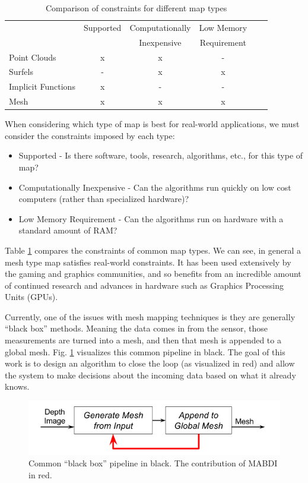 \begin{table}[h]
  \caption{Comparison of constraints for different map types}
  \label{tab:rep}
  \begin{footnotesize}
  \begin{center}
    \begin{tabular}{|l|c|c|c|c|c|}
    \hline
    \multirow{2}{*}{} & Supported & Computationally & Low Memory \\
     & & Inexpensive & Requirement \\\hline
    Point Clouds		& x & x & - \\
    Surfels             	& - & x & x \\
    Implicit Functions 	& x & - & - \\
    Mesh	 	& x & x & x \\
    \hline
    \end{tabular}
  \end{center}
  \end{footnotesize}
\end{table}

When considering which type of map is best for real-world applications, we must
consider the constraints imposed by each type:

\begin{itemize}
  \item Supported - Is there software, tools, research, algorithms, etc., for
  this type of map?
  \item Computationally Inexpensive - Can the algorithms run quickly on low cost
  computers (rather than specialized hardware)?
  \item Low Memory Requirement - Can the algorithms run on hardware with
  a standard amount of RAM?
\end{itemize}

Table \ref{tab:rep} compares the constraints of common map types. We can see, in
general a mesh type map satisfies real-world constraints. It has been used
extensively by the gaming and graphics communities, and so benefits from an
incredible amount of continued research and advances in hardware such as
Graphics Processing Units (GPUs).

Currently, one of the issues with mesh mapping techniques is they are generally
``black box'' methods. Meaning the data comes in from the sensor, those
measurements are turned into a mesh, and then that mesh is appended to a global
mesh. Fig. \ref{fig:pipeline} visualizes this common pipeline in black. The goal
of this work is to design an algorithm to close the loop (as visualized in red)
and allow the system to make decisions about the incoming data based on what it
already knows.

\begin{figure}[h]%
\centering
\includegraphics[width=.5\textwidth]{figures/diagram_general_pipeline.png}
\caption{Common ``black box'' pipeline in black. The contribution of MABDI in red.}
\label{fig:pipeline}
\end{figure}
